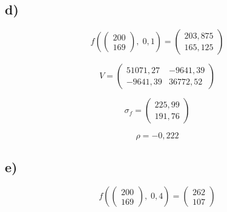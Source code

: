 \subsection*{d)}
\begin{equation}
    f\left(\left(\begin{matrix}
            200\\
            169
        \end{matrix}\right),\; 0,1 \right) = \left(\begin{matrix}
                                                    203,875\\
                                                    165,125
                                                \end{matrix}\right)
\end{equation}

\begin{equation}
    V = \left(\begin{matrix}
            51071,27 & -9641,39\\
            -9641,39 & 36772,52
        \end{matrix}\right)
\end{equation}

\begin{equation}
    \sigma_f = \left(\begin{matrix}
                    225,99\\
                    191,76
                \end{matrix}\right)
\end{equation}

\begin{equation}
    \rho = -0,222
\end{equation}

\subsection*{e)}

\begin{equation}
    f(\left(\begin{matrix}
            200\\
            169
        \end{matrix}\right) ,\; 0,4 ) = \left(\begin{matrix}
                                            262\\
                                            107
                                        \end{matrix}\right)
\end{equation}


